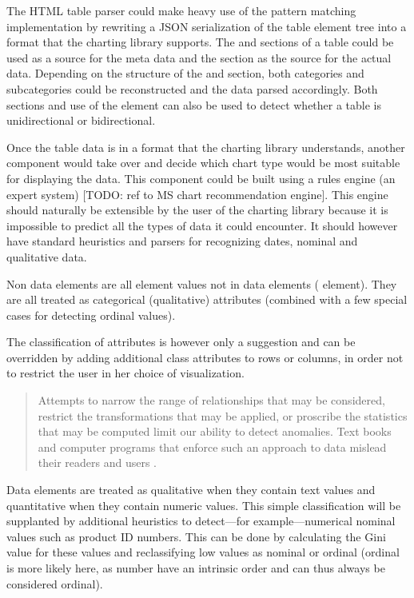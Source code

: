 The HTML table parser could make heavy use of the pattern matching implementation by rewriting a JSON serialization of the table element tree into a format that the charting library supports. The  and  sections of a table could be used as a source for the meta data and the  section as the source for the actual data. Depending on the structure of the  and  section, both categories and subcategories could be reconstructed and the data parsed accordingly. Both sections and use of the  element can also be used to detect whether a table is unidirectional or bidirectional.

Once the table data is in a format that the charting library understands, another component would take over and decide which chart type would be most suitable for displaying the data. This component could be built using a rules engine (an expert system) [TODO: ref to MS chart recommendation engine]. This engine should naturally be extensible by the user of the charting library because it is impossible to predict all the types of data it could encounter. It should however have standard heuristics and parsers for recognizing dates, nominal and qualitative data.

Non data elements are all element values not in data elements ( element). They are all treated as categorical (qualitative) attributes (combined with a few special cases for detecting ordinal values).

The classification of attributes is however only a suggestion and can be overridden by adding additional class attributes to rows or columns, in order not to restrict the user in her choice of visualization.

\begin{quotation}
Attempts to narrow the range of relationships that may be considered, restrict the transformations that may be applied, or proscribe the statistics that may be computed limit our ability to detect anomalies. Text books and computer programs that enforce such an approach to data mislead their readers and users \cite{velleman93}.
\end{quotation}

Data elements are treated as qualitative when they contain text values and quantitative when they contain numeric values. This simple classification will be supplanted by additional heuristics to detect---for example---numerical nominal values such as product ID numbers. This can be done by calculating the Gini value for these values and reclassifying low values as nominal or ordinal (ordinal is more likely here, as number have an intrinsic order and can thus always be considered ordinal). 


